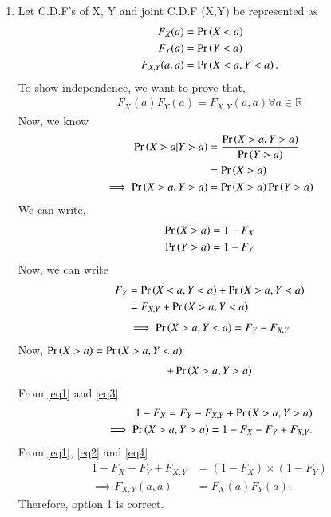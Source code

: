 \documentclass[journal,12pt,twocolumn]{IEEEtran}
\begin{document}
\begin{enumerate}

\item Let C.D.F's of X, Y and joint C.D.F (X,Y) be represented as
\begin{align}
    F_X(a) &= \Pr\left(X < a\right)\\
    F_Y(a) &= \Pr\left(Y < a\right)\\
    F_{X,Y}(a,a) &= \Pr\left(X < a, Y < a\right).
\end{align}
To show independence, we want to prove that,
\begin{align}
    F_X(a)F_Y(a) = F_{X, Y}(a,a) \forall a \in \mathbb{R}
\end{align}
Now, we know
\begin{align}
    \Pr\left(X>a|Y>a\right) &= \frac{\Pr\left(X>a, Y>a\right)}{\Pr\left(Y>a\right)}\\
    &= \Pr\left(X>a\right)\\
    \implies \Pr\left(X>a, Y>a\right) &= \Pr\left(X>a\right) \Pr\left(Y>a\right)
\end{align}
We can write, 
\begin{align}
    \Pr\left(X>a\right) &= 1 - F_X\label{eq1}\\
    \Pr\left(Y>a\right) &= 1 - F_Y\label{eq2}
\end{align}
Now, we can write
\begin{align}
    F_Y &= \Pr\left(X<a, Y<a\right) + \Pr\left(X>a, Y<a\right)\\
    &= F_{X,Y} + \Pr\left(X>a, Y<a\right)
\end{align}
\begin{align}
\implies \Pr\left(X>a, Y<a\right) = F_Y - F_{X,Y}\label{eq3}
\end{align}
Now, 
\begin{math}
\Pr\left(X>a\right)=\Pr\left(X>a, Y<a\right)
\end{math}
\begin{align}
    +\Pr\left(X>a, Y>a\right)
\end{align}
From \eqref{eq1} and \eqref{eq3}
\begin{align}
    1 - F_X = F_Y - F_{X,Y} + \Pr\left(X>a, Y>a\right)\\
    \implies \Pr\left(X>a, Y>a\right) = 1 - F_X - F_Y + F_{X,Y}.\label{eq4}
\end{align}
From \eqref{eq1}, \eqref{eq2} and \eqref{eq4}
\begin{align}
    1 - F_X - F_Y + F_{X,Y} &= (1 - F_X) \times (1 - F_Y)\\
    \implies F_{X, Y}(a,a) &= F_X(a)F_Y(a).
\end{align}
Therefore, option 1 is correct.
    

\end{enumerate}
\end{document}
